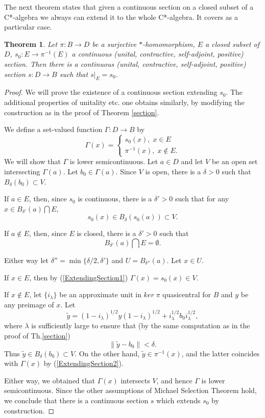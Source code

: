 \documentclass{article}%
\newtheorem{theorem}{Theorem}
\begin{document}
\medskip


The next theorem states that given a continuous section on a closed subset of a C*-algebra  we always can extend it to the whole C*-algebra.
It covers  \cite[Lemma 2.6.]{FGT} as a particular case.


\begin{theorem}\label{ExtendingSection} Let $\pi: B \to D$ be a surjective $\ast$-homomorphism, $E$ a closed subset of $D$, $s_0: E \to \pi^{-1}(E)$ a continuous (unital, contractive, self-adjoint, positive) section. Then there is a continuous (unital, contractive, self-adjoint, positive) section $s: D \to B$ such that $s|_E = s_0$.
\end{theorem}
\begin{proof} We will prove the existence of a continuous section extending $s_0$. The additional properties of unitality etc. one obtains similarly, by modifying the construction as in the proof of Theorem \ref{section}.

We define  a set-valued function $\Gamma: D\to B$ by
$$\Gamma(x) = \begin{cases} s_0(x), \; x\in E \\ \pi^{-1}(x), \; x\notin E.\end{cases}$$ We will show that $\Gamma$ is lower semicontinuous.  Let $a\in D$ and let $V$ be an open set intersecting $\Gamma(a)$. Let $b_0\in \Gamma(a)$. Since $V$ is open, there is a $\delta>0$ such that $B_{\delta}(b_0)\subset V$.

If $a\in E$, then, since $s_0$ is continuous, there is a $\delta'>0$ such that for any $x\in B_{\delta'}(a)\bigcap E$,
\begin{equation}\label{ExtendingSection1}s_0(x)\in B_{\delta}(s_0(a)) \subset V.\end{equation}

If $a\notin E$, then, since $E$ is closed, there is a $\delta'>0$ such that \begin{equation}\label{ExtendingSection2}B_{\delta'}(a)\bigcap E = \emptyset.\end{equation}

Either way let $\delta'' = \min\{\delta/2, \delta'\}$ and $U = B_{\delta''}(a).$ Let $x\in U$.

If $x\in E$, then by (\ref{ExtendingSection1}) $\Gamma(x) = s_0(x) \in V$.


If $x\notin E$, let  $\{i_{\lambda}\}$ be an approximate unit in $ker \;\pi$ quasicentral for $B$ and $y$ be any preimage of $x$. Let
$$\tilde y =  (1-i_{\lambda})^{1/2}y(1-i_{\lambda})^{1/2} + i_{\lambda}^{1/2}b_0i_{\lambda}^{1/2},$$ where $\lambda$ is sufficiently large to ensure that (by the same computation as in the proof of Th.\ref{section}) $$ \|\tilde y - b_0\|< \delta.$$ Thus $\tilde y\in B_{\delta}(b_0) \subset V$. On the other hand,
$\tilde y \in \pi^{-1}(x)$, and the latter coincides with $\Gamma(x)$ by (\ref{ExtendingSection2}).

Either way, we obtained that $\Gamma(x)$ intersects $V$, and hence $\Gamma$ is lower semicontinuous. Since the other assumptions of Michael Selection Theorem hold, we conclude that there is a continuous section $s$ which extends $s_0$ by construction.
\end{proof}
\end{document}
